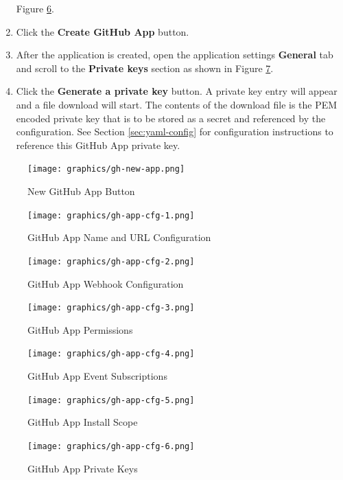 \begin{enumerate}
    Figure \ref{fig:gh-app-cfg-5}.
    \item Click the \textbf{Create GitHub App} button.
    \item After the application is created, open the application settings \textbf{General} tab and scroll to the
    \textbf{Private keys} section as shown in Figure \ref{fig:gh-app-cfg-6}.
    \item Click the \textbf{Generate a private key} button.  A private key entry will appear and a file download will start.
    The contents of the download file is the PEM encoded private key that is to be stored as a secret and
    referenced by the \cxoneflow configuration.  See Section \ref{sec:yaml-config} for configuration instructions to
    reference this GitHub App private key.
\end{enumerate}

\begin{figure}[ht]
    \texttt{[image: graphics/gh-new-app.png]}
    \caption{New GitHub App Button}
    \label{fig:gh-new-app}
\end{figure}


\begin{figure}[ht]
    \texttt{[image: graphics/gh-app-cfg-1.png]}
    \caption{GitHub App Name and URL Configuration}
    \label{fig:gh-app-cfg-1}
\end{figure}

\begin{figure}[ht]
    \texttt{[image: graphics/gh-app-cfg-2.png]}
    \caption{GitHub App Webhook Configuration}
    \label{fig:gh-app-cfg-2}
\end{figure}

\begin{figure}[ht]
    \texttt{[image: graphics/gh-app-cfg-3.png]}
    \caption{GitHub App Permissions}
    \label{fig:gh-app-cfg-3}
\end{figure}

\begin{figure}[ht]
    \texttt{[image: graphics/gh-app-cfg-4.png]}
    \caption{GitHub App Event Subscriptions}
    \label{fig:gh-app-cfg-4}
\end{figure}

\begin{figure}[ht]
    \texttt{[image: graphics/gh-app-cfg-5.png]}
    \caption{GitHub App Install Scope}
    \label{fig:gh-app-cfg-5}
\end{figure}

\begin{figure}[ht]
    \texttt{[image: graphics/gh-app-cfg-6.png]}
    \caption{GitHub App Private Keys}
    \label{fig:gh-app-cfg-6}
\end{figure}

